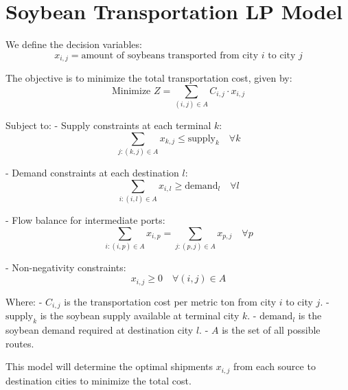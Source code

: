 \documentclass{article}
\begin{document}
\section*{Soybean Transportation LP Model}

We define the decision variables:
\[
x_{i,j} = \text{amount of soybeans transported from city } i \text{ to city } j
\]

The objective is to minimize the total transportation cost, given by:
\[
\text{Minimize } Z = \sum_{(i,j) \in A} C_{i,j} \cdot x_{i,j}
\]

Subject to:
- Supply constraints at each terminal \( k \):
  \[
  \sum_{j: (k,j) \in A} x_{k,j} \leq \text{supply}_k \quad \forall k
  \]

- Demand constraints at each destination \( l \):
  \[
  \sum_{i: (i,l) \in A} x_{i,l} \geq \text{demand}_l \quad \forall l
  \]

- Flow balance for intermediate ports:
  \[
  \sum_{i: (i,p) \in A} x_{i,p} = \sum_{j: (p,j) \in A} x_{p,j} \quad \forall p
  \]

- Non-negativity constraints:
  \[
  x_{i,j} \geq 0 \quad \forall (i,j) \in A
  \]

Where:
- \( C_{i,j} \) is the transportation cost per metric ton from city \( i \) to city \( j \).
- \( \text{supply}_k \) is the soybean supply available at terminal city \( k \).
- \( \text{demand}_l \) is the soybean demand required at destination city \( l \).
- \( A \) is the set of all possible routes.

This model will determine the optimal shipments \( x_{i,j} \) from each source to destination cities to minimize the total cost.
\end{document}
